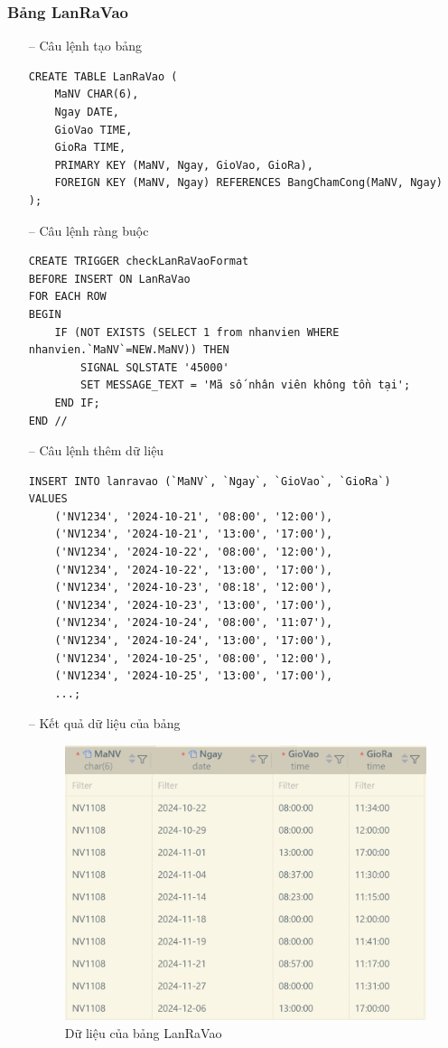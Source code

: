 \subsubsection{Bảng LanRaVao}
\begin{itemize}
    \item [--] Câu lệnh tạo bảng
   \begin{verbatim}
CREATE TABLE LanRaVao (
    MaNV CHAR(6),
    Ngay DATE,
    GioVao TIME,
    GioRa TIME,
    PRIMARY KEY (MaNV, Ngay, GioVao, GioRa),
    FOREIGN KEY (MaNV, Ngay) REFERENCES BangChamCong(MaNV, Ngay)
);
    \end{verbatim}
    \item [--] Câu lệnh ràng buộc
   \begin{verbatim}
CREATE TRIGGER checkLanRaVaoFormat 
BEFORE INSERT ON LanRaVao
FOR EACH ROW
BEGIN
    IF (NOT EXISTS (SELECT 1 from nhanvien WHERE nhanvien.`MaNV`=NEW.MaNV)) THEN
        SIGNAL SQLSTATE '45000'
        SET MESSAGE_TEXT = 'Mã số nhân viên không tồn tại';
    END IF;
END //
    \end{verbatim}
    \newpage
    \item [--] Câu lệnh thêm dữ liệu
   \begin{verbatim}
INSERT INTO lanravao (`MaNV`, `Ngay`, `GioVao`, `GioRa`) 
VALUES
    ('NV1234', '2024-10-21', '08:00', '12:00'),
    ('NV1234', '2024-10-21', '13:00', '17:00'),
    ('NV1234', '2024-10-22', '08:00', '12:00'),
    ('NV1234', '2024-10-22', '13:00', '17:00'),
    ('NV1234', '2024-10-23', '08:18', '12:00'),
    ('NV1234', '2024-10-23', '13:00', '17:00'),
    ('NV1234', '2024-10-24', '08:00', '11:07'),
    ('NV1234', '2024-10-24', '13:00', '17:00'),
    ('NV1234', '2024-10-25', '08:00', '12:00'),
    ('NV1234', '2024-10-25', '13:00', '17:00'),
    ...;
    \end{verbatim}
    \item [--] Kết quả dữ liệu của bảng
    \begin{figure}[H]
        \centering
        \includegraphics[width=1\linewidth]{content/images/data_lanravao.png}
        \caption{Dữ liệu của bảng LanRaVao}
        \label{fig:data_lanravao}
    \end{figure}
\end{itemize}
\newpage

